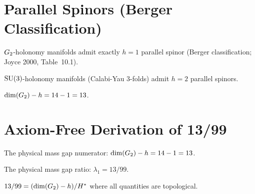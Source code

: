 \section{Parallel Spinors (Berger Classification)}

\begin{definition}\label{def:parallel_spinors_G2}
    \leanok
    $G_2$-holonomy manifolds admit exactly $h = 1$ parallel spinor
    (Berger classification; Joyce 2000, Table~10.1).
\end{definition}

\begin{definition}\label{def:parallel_spinors_SU3}
    \leanok
    $\mathrm{SU}(3)$-holonomy manifolds (Calabi-Yau 3-folds) admit $h = 2$ parallel spinors.
\end{definition}

\begin{theorem}\label{thm:physical_spectral_product}
    \leanok
    $\mathrm{dim}(G_2) - h = 14 - 1 = 13$.
\end{theorem}

\section{Axiom-Free Derivation of 13/99}

\begin{definition}\label{def:physical_gap_num}
    \leanok
    The physical mass gap numerator: $\mathrm{dim}(G_2) - h = 14 - 1 = 13$.
\end{definition}

\begin{definition}\label{def:physical_gap_ratio}
    \leanok
    The physical mass gap ratio: $\lambda_1 = 13/99$.
\end{definition}

\begin{theorem}\label{thm:physical_gap_topology}
    \leanok
    $13/99 = (\mathrm{dim}(G_2) - h) / H^*$ where all quantities are topological.
\end{theorem}

